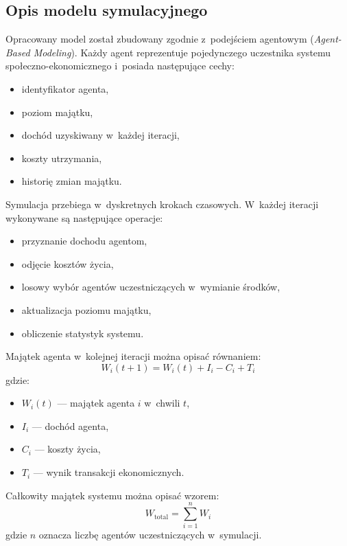 \documentclass[polish]{projectreport}
\begin{document}
\subsection{Opis modelu symulacyjnego}
\label{sec:model}

Opracowany model zosta\l{} zbudowany zgodnie z~podej\'sciem agentowym
(\emph{Agent-Based Modeling}). Ka\.{z}dy agent reprezentuje pojedynczego uczestnika
systemu spo\l{}eczno-ekonomicznego i~posiada nast\k{e}puj\k{a}ce cechy:
\begin{itemize}
  \item identyfikator agenta,
  \item poziom maj\k{a}tku,
  \item doch\'od uzyskiwany w~ka\.{z}dej iteracji,
  \item koszty utrzymania,
  \item histori\k{e} zmian maj\k{a}tku.
\end{itemize}

Symulacja przebiega w~dyskretnych krokach czasowych. W~ka\.{z}dej iteracji wykonywane
s\k{a} nast\k{e}puj\k{a}ce operacje:
\begin{itemize}
  \item przyznanie dochodu agentom,
  \item odj\k{e}cie koszt\'ow \.{z}ycia,
  \item losowy wyb\'or agent\'ow uczestnicz\k{a}cych w~wymianie \'srodk\'ow,
  \item aktualizacja poziomu maj\k{a}tku,
  \item obliczenie statystyk systemu.
\end{itemize}

Maj\k{a}tek agenta w~kolejnej iteracji mo\.{z}na opisa\'{c} r\'ownaniem:
\begin{equation}
  W_i(t+1) = W_i(t) + I_i - C_i + T_i
\end{equation}
gdzie:
\begin{itemize}
  \item $W_i(t)$ --- maj\k{a}tek agenta $i$ w~chwili $t$,
  \item $I_i$ --- doch\'od agenta,
  \item $C_i$ --- koszty \.{z}ycia,
  \item $T_i$ --- wynik transakcji ekonomicznych.
\end{itemize}

Ca\l{}kowity maj\k{a}tek systemu mo\.{z}na opisa\'{c} wzorem:
\begin{equation}
  W_{\mathrm{total}} = \sum_{i=1}^{n} W_i
\end{equation}
gdzie $n$ oznacza liczb\k{e} agent\'ow uczestnicz\k{a}cych w~symulacji.
\end{document}
